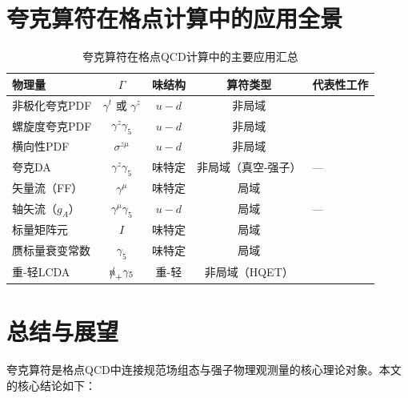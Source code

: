 \documentclass[12pt,a4paper]{ctexart}
\theoremstyle{definition}
\begin{document}
\section{夸克算符在格点计算中的应用全景}

\begin{table}[H]
\centering
\caption{夸克算符在格点QCD计算中的主要应用汇总}
\label{tab:quark_op_applications}
\begin{tabular}{lcccl}
\toprule
物理量 & $\Gamma$ & 味结构 & 算符类型 & 代表性工作 \\
\midrule
非极化夸克PDF & $\gamma^t$ 或 $\gamma^z$ & $u-d$ & 非局域 & \cite{Liu2019isovector} \\
螺旋度夸克PDF & $\gamma^z\gamma_5$ & $u-d$ & 非局域 & \cite{LP3helicity} \\
横向性PDF  & $\sigma^{z\mu}$ & $u-d$ & 非局域 & \cite{Chu2024transversity} \\
夸克DA & $\gamma^z\gamma_5$ & 味特定 & 非局域（真空-强子） & — \\
矢量流（FF） & $\gamma^\mu$ & 味特定 & 局域 & \cite{CLQCD2024charm} \\
轴矢流（$g_A$） & $\gamma^\mu\gamma_5$ & $u-d$ & 局域 & — \\
标量矩阵元 & $I$ & 味特定 & 局域 & \cite{CLQCD2025quark_mass} \\
赝标量衰变常数 & $\gamma_5$ & 味特定 & 局域 & \cite{CLQCD2024charm} \\
重-轻LCDA & $\slashed{n}_+\gamma_5$ & 重-轻 & 非局域（HQET）& \cite{Han2025heavy} \\
\bottomrule
\end{tabular}
\end{table}

\section{总结与展望}

夸克算符是格点QCD中连接规范场组态与强子物理观测量的核心理论对象。本文的核心结论如下：
\end{document}
